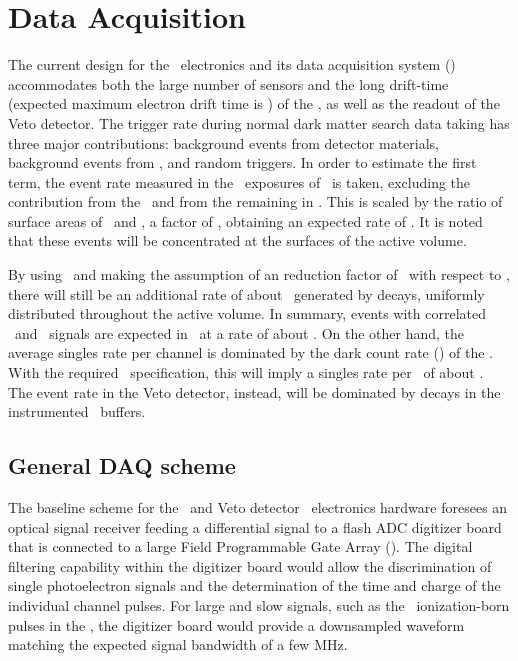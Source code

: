 \section{Data Acquisition}
\label{sec:DAQ}

The current design for the \DSks\ electronics and its data acquisition system (\DAQ) accommodates both the large number of sensors and the long drift-time (expected maximum electron drift time is \DSkDriftTimeBig) of the \LArTPC, as well as the readout of the Veto detector.  The trigger rate during normal dark matter search data taking has three major contributions: background events from detector materials, background events from , and random triggers.  In order to estimate the first term, the event rate measured in the \UAr\ exposures of \DSfs\ is taken, excluding the contribution from the \PMTs\ and from the remaining  in \DSfs.  This is scaled by the ratio of surface areas of \DSks\ and \DSfs, a factor of \DSkOverDSfAreaRatio, obtaining an expected rate of \DSkTriggerSurfaceRate.  It is noted that these events will be concentrated at the surfaces of the active volume.  

By using \UAr\ and making the assumption of an  reduction factor of \DSkDArThreeNineDepletion\ with respect to \AAr,  there will still be an additional rate of about \DSkTriggerDArThreeNineRate\ generated by  decays, uniformly distributed throughout the active volume.  In summary, events with correlated \SOne\ and \STwo\ signals are expected in \DSks\ at a rate of about \DSkTriggerTotalRateBig.  On the other hand, the average singles rate per channel is dominated by the dark count rate (\DCR) of the \SiPMs.  With the required \DSkSiPMDCRSpecificationBig\ specification, this will imply a singles rate per \DSkPdm\ of about  \DSkTileDCRSpecificationBig.  The event rate in the Veto detector, instead, will be dominated by  decays in the instrumented \AAr\ buffers. 


\subsection{General DAQ scheme}

The baseline scheme for the \TPC\ and Veto detector \DAQ\ electronics hardware foresees an optical signal receiver feeding a differential signal to a flash ADC digitizer board that is connected to a large Field Programmable Gate Array (\FPGA).  The digital filtering capability within the digitizer board would allow the discrimination of single photoelectron signals and the determination of the time and charge of the individual channel pulses.  For large and slow signals, such as the \STwo\ ionization-born pulses in the \TPC, the digitizer board would provide a downsampled waveform matching the expected signal bandwidth of a few \si{\MHz}. 

